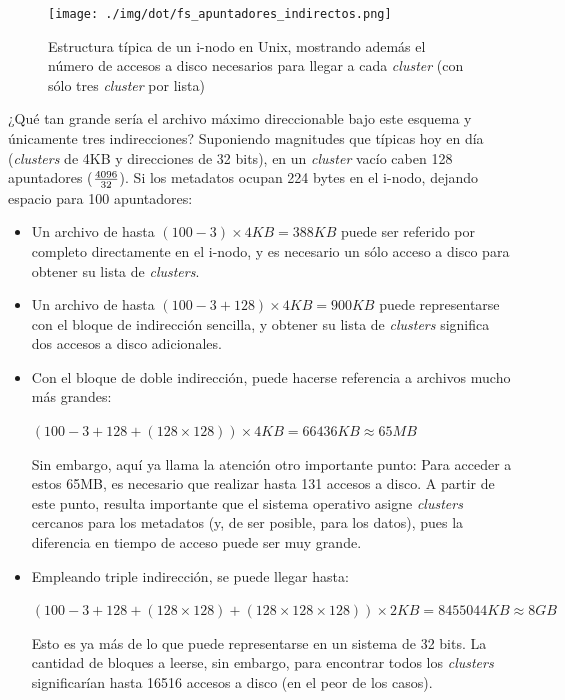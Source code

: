 \documentclass[11pt,fleqn]{book} %
\begin{document}
\begin{figure}[htb]
\centering
\texttt{[image: ./img/dot/fs\_apuntadores\_indirectos.png]}
\caption{\label{FS_fs_apuntadores_indirectos}Estructura típica de un i-nodo en Unix, mostrando además el número de accesos a disco necesarios para llegar a cada \emph{cluster} (con sólo tres \emph{cluster} por lista)}
\end{figure}

¿Qué tan grande sería el archivo máximo direccionable bajo este
esquema y únicamente tres indirecciones? Suponiendo magnitudes que
típicas hoy en día (\emph{clusters} de 4KB y direcciones de 32 bits), en un
\emph{cluster} vacío caben 128 apuntadores ($4096 \over 32$). Si los
metadatos ocupan 224 bytes en el i-nodo, dejando espacio para 100
apuntadores:

\begin{itemize}
\item Un archivo de hasta $(100-3) \times 4KB = 388KB$ puede ser referido
  por completo directamente en el i-nodo, y es necesario un sólo
  acceso a disco para obtener su lista de \emph{clusters}.
\item Un archivo de hasta $(100-3 + 128) \times 4KB = 900KB$ puede
  representarse con el bloque de indirección sencilla, y obtener su
  lista de \emph{clusters} significa dos accesos a disco adicionales.
\item Con el bloque de doble indirección, puede hacerse referencia a
  archivos mucho más grandes:

  $(100-3 + 128 + (128\times 128) ) \times 4KB = 66436KB \approx 65MB$

  Sin embargo, aquí ya llama la atención otro importante punto: Para
  acceder a estos 65MB, es necesario que realizar hasta 131 accesos a
  disco. A partir de este punto, resulta importante que el sistema
  operativo asigne \emph{clusters} cercanos para los metadatos (y, de ser
  posible, para los datos), pues la diferencia en tiempo de acceso
  puede ser muy grande.
\item Empleando triple indirección, se puede llegar hasta:

  $(100-3 + 128 + (128 \times 128) + (128 \times 128 \times 128) )
  \times 2KB = 8455044KB \approx 8GB$

  Esto es ya más de lo que puede representarse en un sistema de 32
  bits. La cantidad de bloques a leerse, sin embargo, para encontrar
  todos los \emph{clusters} significarían hasta 16516 accesos a disco (en
  el peor de los casos).
\end{itemize}
\end{document}
